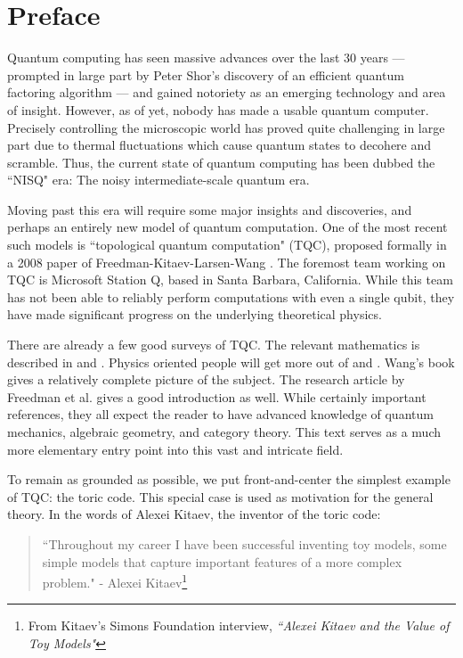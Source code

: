 \documentclass{article}
\theoremstyle{definition}
\numberwithin{figure}{section}
\begin{document}
\newpage

\section{Preface}
\label{Preface}

Quantum computing has seen massive advances over the last 30 years — prompted in large part by Peter Shor's discovery of an efficient quantum factoring algorithm \cite{shor1994algorithms} — and gained notoriety as an emerging technology and area of insight. However, as of yet, nobody has made a usable quantum computer. Precisely controlling the microscopic world has proved quite challenging in large part due to thermal fluctuations which cause quantum states to decohere and scramble. Thus, the current state of quantum computing has been dubbed the ``NISQ" era: The noisy intermediate-scale quantum era.

Moving past this era will require some major insights and discoveries, and perhaps an entirely new model of quantum computation. One of the most recent such models is ``topological quantum computation" (TQC), proposed formally in a 2008 paper of Freedman-Kitaev-Larsen-Wang \cite{freedman2003topological}. The foremost team working on TQC is Microsoft Station Q, based in Santa Barbara, California. While this team has not been able to reliably perform computations with even a single qubit, they have made significant progress on the underlying theoretical physics.

There are already a few good surveys of TQC. The relevant mathematics is described in \cite{bakalov2001lectures} and \cite{rowell2018mathematics}. Physics oriented people will get more out of \cite{preskill1999lecture} and \cite{nayak2008non}. Wang's book \cite{wang2010topological} gives a relatively complete picture of the subject. The research article by Freedman et al. \cite{freedman2002simulation} gives a good introduction as well. While certainly important references, they all expect the reader to have advanced knowledge of quantum mechanics, algebraic geometry, and category theory. This text serves as a much more elementary entry point into this vast and intricate field.

To remain as grounded as possible, we put front-and-center the simplest example of TQC: the toric code. This special case is used as motivation for the general theory. In the words of Alexei Kitaev, the inventor of the toric code:

\begin{quote}
``Throughout my career I have been successful inventing toy models, some simple models that capture important features of a more complex problem." - Alexei Kitaev\footnote{From Kitaev's Simons Foundation interview, \textit{``Alexei Kitaev and the Value of Toy Models"}}
\end{quote}
\end{document}
